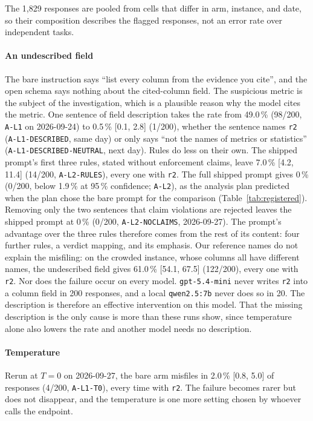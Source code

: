 \documentclass[smallextended,natbib]{svjour3}
\begin{document}
 The 1{,}829 responses are pooled from cells that
differ in arm, instance, and date, so their composition describes the flagged
responses, not an error rate over independent tasks.

\paragraph{An undescribed field}
The bare instruction says ``list every column from the evidence you cite'',
and the open schema says nothing about the cited-column field. The suspicious
metric is the subject of the investigation, which is a plausible reason why
the model cites the metric. One sentence of field description takes the rate
from 49.0\,\% (98/200, \texttt{A-L1} on 2026-09-24) to 0.5\,\% [0.1, 2.8]
(1/200), whether the sentence names \texttt{r2} (\texttt{A-L1-DESCRIBED}, same
day) or only says ``not the names of metrics or statistics''
(\texttt{A-L1-DESCRIBED-NEUTRAL}, next day). Rules do less on their own. The
shipped prompt's first three rules, stated without enforcement claims, leave
7.0\,\% [4.2, 11.4] (14/200, \texttt{A-L2-RULES}), every one with
\texttt{r2}. The full shipped prompt gives 0\,\% (0/200, below 1.9\,\% at
95\,\% confidence; \texttt{A-L2}), as the analysis plan predicted when the
plan chose the bare prompt for the comparison (Table~\ref{tab:registered}).
Removing only the two sentences that claim violations are rejected leaves the
shipped prompt at 0\,\% (0/200, \texttt{A-L2-NOCLAIMS}, 2026-09-27). The
prompt's advantage over the three rules therefore comes from the rest of its
content: four further rules, a verdict mapping, and its emphasis. Our
reference names do not explain the misfiling: on the crowded instance, whose
columns all have different names, the undescribed field gives 61.0\,\% [54.1,
67.5] (122/200), every one with \texttt{r2}. Nor does the failure occur on
every model. \texttt{gpt-5.4-mini} never writes \texttt{r2} into a column
field in 200 responses, and a local \texttt{qwen2.5:7b} never does so in 20.
The description is therefore an effective intervention on this model. That
the missing description is the only cause is more than these runs show, since
temperature alone also lowers the rate and another model needs no
description.

\paragraph{Temperature}
Rerun at $T=0$ on 2026-09-27, the bare arm misfiles in 2.0\,\% [0.8, 5.0] of
responses (4/200, \texttt{A-L1-T0}), every time with \texttt{r2}. The failure
becomes rarer but does not disappear, and the temperature is one more setting
chosen by whoever calls the endpoint.
\end{document}
